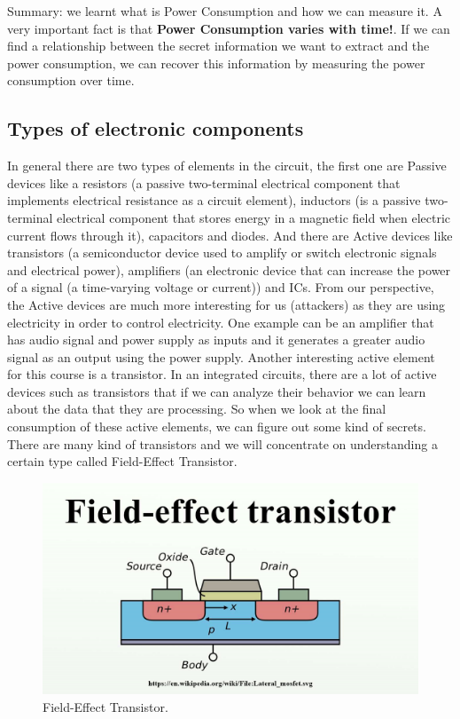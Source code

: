 Summary: we learnt what is Power Consumption and how we can measure it.
A very important fact is that \textbf{Power Consumption varies with time!}.
If we can find a relationship between the secret information we want to extract and the power consumption, we can recover this information by measuring the power consumption over time.

\subsection{Types of electronic components}
In general there are two types of elements in the circuit, the first one are Passive devices like a resistors (a passive two-terminal electrical component that implements electrical resistance as a circuit element), inductors (is a passive two-terminal electrical component that stores energy in a magnetic field when electric current flows through it), capacitors and diodes. And there are Active devices like transistors (a semiconductor device used to amplify or switch electronic signals and electrical power), amplifiers (an electronic device that can increase the power of a signal (a time-varying voltage or current)) and ICs. From our perspective, the Active devices are much more interesting for us (attackers) as they are using electricity in order to control electricity. One example can be an amplifier that has audio signal and power supply as inputs and it generates a greater audio signal as an output using the power supply. 
Another interesting active element for this course is a transistor. In an integrated circuits, there are a lot of active devices such as transistors  that if we can analyze their behavior we can learn about the data that they are processing. So when we look at the final consumption of these active elements, we can figure out some kind of secrets.
There are many kind of transistors and we will concentrate on understanding a certain type called Field-Effect Transistor.
\begin{figure}
	\centering
	\includegraphics{images/field_effect_transistor.png}
	\caption{Field-Effect Transistor.} \label{field_effect_transistor:fig}
\end{figure}
